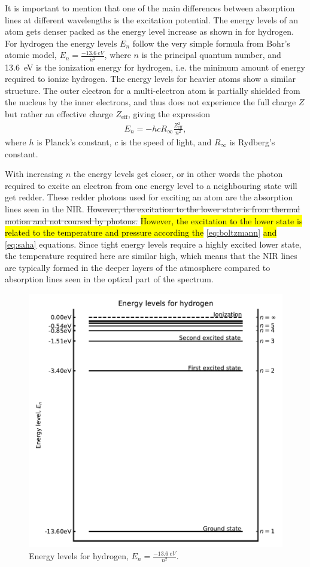 It is important to mention that one of the main differences between absorption lines at different
wavelengths is the excitation potential. The energy levels of an atom gets denser packed as the
energy level increase as shown in  for hydrogen. For hydrogen the energy levels
$E_n$ follow the very simple formula from Bohr's atomic model, $E_n=\frac{\SI{-13.6}{eV}}{n^2}$,
where $n$ is the principal quantum number, and \SI{13.6}{eV} is the ionization energy for hydrogen,
i.e. the minimum amount of energy required to ionize hydrogen. The energy levels for heavier atoms
show a similar structure. The outer electron for a multi-electron atom is partially shielded from
the nucleus by the inner electrons, and thus does not experience the full charge $Z$ but rather an
effective charge $Z_\mathrm{eff}$, giving the expression
\begin{align}
  E_n = -hcR_\infty\frac{Z_\mathrm{eff}^2}{n^2},
\end{align}
where $h$ is Planck's constant, $c$ is the speed of light, and $R_\infty$ is Rydberg's constant.

With increasing $n$ the energy levels get closer, or in other words the photon required to excite an
electron from one energy level to a neighbouring state will get redder. These redder photons used
for exciting an atom are the absorption lines seen in the NIR. \st{However, the excitation to the
lower state is from thermal motion and not coursed by photons.} \hl{However, the excitation to the
lower state is related to the temperature and pressure according the} \ref{eq:boltzmann} \hl{and}
\ref{eq:saha} equations. Since tight energy levels require a highly excited lower state, the
temperature required here are similar high, which means that the NIR lines are typically formed in
the deeper layers of the atmosphere compared to absorption lines seen in the optical part of the
spectrum.

\begin{figure}[htpb!]
    \centering
    \includegraphics[width=0.85\linewidth]{figures/energyLevels.pdf}
    \caption{Energy levels for hydrogen, $E_n=\frac{\SI{-13.6}{eV}}{n^2}$.}
    \label{fig:elevel}
\end{figure}

